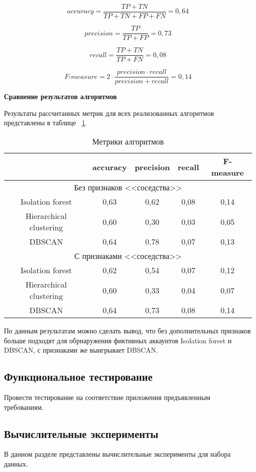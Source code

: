 $$
accuracy = \frac{TP+TN}{TP+TN+FP+FN} = 0,64
$$

$$
precision = \frac{TP}{TP+FP} =  0,73
$$

$$
recall = \frac{TP+TN}{TP+FN} = 0,08
$$

$$
F\text{-}measure = 2\cdot \frac{precision \cdot recall}{precision+recall} = 0,14
$$

\vspace{1.5em}
\textbf{Сравнение результатов алгоритмов}

Результаты рассчитанных метрик для всех реализованных алгоритмов представлены в таблице ~\ref{tabular:tableСomparison}.

\begin{table}[H]
    \onehalfspacing \caption{Метрики алгоритмов}
    \medskip
        \begin{tabular}{c|c|c|c|c}
            & accuracy & precision & recall & F-measure \\ \hline
            \multicolumn{5}{c}{Без признаков <<соседства>>} \\ \hline
            Isolation forest & 0,63 & 0,62 & 0,08 & 0,14 \\  \hline 
            Hierarchical clustering & 0,60 & 0,30 & 0,03 & 0,05 \\  \hline 
            DBSCAN & 0,64 & 0,78 & 0,07 & 0,13\\ \hline 
            \multicolumn{5}{c}{С признаками <<соседства>>} \\ \hline
            Isolation forest & 0,62 & 0,54 & 0,07 & 0,12 \\  \hline 
            Hierarchical clustering & 0,60 & 0,33 & 0,04 & 0,07 \\  \hline 
            DBSCAN & 0,64 & 0,73 & 0,08 & 0,14\\ 
        \end{tabular}
    \label{tabular:tableСomparison}
\end{table}

По данным результатам можно сделать вывод, что без дополнительных признаков больше подходят для обрнаружения фиктивных аккаунтов Isolation forest и DBSCAN, с признаками же выигрывает DBSCAN.

\subsection{Функциональное тестирование}
Провести тестирование на соответствие приложения предъявленным требованиям. 

\vspace{1.5em}
\subsection{Вычислительные эксперименты}
В данном разделе представлены вычислительные эксперименты для набора данных.